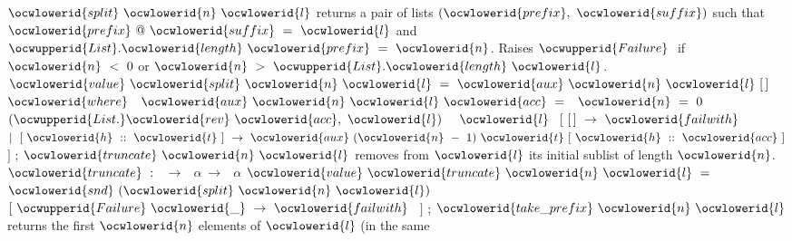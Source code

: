 \documentclass[12pt]{article}
\begin{document}
\ocwendcode{}\ocwindent{0.00em}
\ocwbegindcode{}$\ocwlowerid{split}~\ocwlowerid{n}~\ocwlowerid{l}$\ocwenddcode{} returns a pair of lists \ocwbegindcode{}$(\ocwlowerid{prefix},~\ocwlowerid{suffix})$\ocwenddcode{} such that
   \ocwbegindcode{}$\ocwlowerid{prefix}~@~\ocwlowerid{suffix}~=~\ocwlowerid{l}$\ocwenddcode{} and \ocwbegindcode{}$\ocwupperid{List}.\ocwlowerid{length}~\ocwlowerid{prefix}~=~\ocwlowerid{n}$\ocwenddcode{}.  
   Raises \ocwbegindcode{}$\ocwupperid{Failure}~$\ocwenddcode{} if \ocwbegindcode{}$\ocwlowerid{n}~<~0$\ocwenddcode{} or \ocwbegindcode{}$\ocwlowerid{n}~>~\ocwupperid{List}.\ocwlowerid{length}~\ocwlowerid{l}$\ocwenddcode{}.  
\ocweol
\label{../ML/list2.ml:2746}%
\medskip
\ocwbegincode{}\ocwindent{0.00em}
$\ocwlowerid{value}~\ocwlowerid{split}~\ocwlowerid{n}~\ocwlowerid{l}~=~\ocwlowerid{aux}~\ocwlowerid{n}~\ocwlowerid{l}~[\,]$\ocweol
\ocwindent{1.00em}
$\ocwlowerid{where}~$~$\ocwlowerid{aux}~\ocwlowerid{n}~\ocwlowerid{l}~\ocwlowerid{acc}~=$\ocweol
\ocwindent{1.00em}
~$\ocwlowerid{n}~=~0~$~$(\ocwupperid{List.}\ocwlowerid{rev}~\ocwlowerid{acc},~\ocwlowerid{l})~$\ocweol
\ocwindent{2.00em}
~$\ocwlowerid{l}~$\ocweol
\ocwindent{2.00em}
$[~[\,]~\rightarrow{}~\ocwlowerid{failwith}~$\ocweol
\ocwindent{2.00em}
$\mid{}~[~\ocwlowerid{h}~::~\ocwlowerid{t}~]~\rightarrow{}~\ocwlowerid{aux}~(\ocwlowerid{n}~-~1)~\ocwlowerid{t}~[~\ocwlowerid{h}~::~\ocwlowerid{acc}~]$\ocweol
\ocwindent{2.00em}
$]$\ocweol
\ocwindent{0.00em}
;\ocweol
\ocwindent{0.00em}
\ocwbc{} \ocwbegindcode{}$\ocwlowerid{truncate}~\ocwlowerid{n}~\ocwlowerid{l}$\ocwenddcode{} removes from \ocwbegindcode{}$\ocwlowerid{l}$\ocwenddcode{} its initial sublist of length \ocwbegindcode{}$\ocwlowerid{n}$\ocwenddcode{}. \ocwec{}\ocweol
\ocwindent{0.00em}
\ocwbc{} \ocwbegindcode{}$\ocwlowerid{truncate}~:~$~$\rightarrow{}~$~$\alpha{}~\rightarrow{}~$~$\alpha{}$\ocwenddcode{}                             \ocwec{}\ocweol
\ocwindent{0.00em}
$\ocwlowerid{value}~\ocwlowerid{truncate}~\ocwlowerid{n}~\ocwlowerid{l}~=$\ocweol
\ocwindent{1.00em}
~$\ocwlowerid{snd}~(\ocwlowerid{split}~\ocwlowerid{n}~\ocwlowerid{l})~$~$[~\ocwupperid{Failure}~\ocwlowerid{\_}~\rightarrow{}~\ocwlowerid{failwith}~$~$]$\ocweol
\ocwindent{0.00em}
;\ocweol
\ocwindent{0.00em}
\ocwbc{} \ocwbegindcode{}$\ocwlowerid{take\_prefix}~\ocwlowerid{n}~\ocwlowerid{l}$\ocwenddcode{} returns the first \ocwbegindcode{}$\ocwlowerid{n}$\ocwenddcode{} elements of \ocwbegindcode{}$\ocwlowerid{l}$\ocwenddcode{} (in the same
\end{document}
